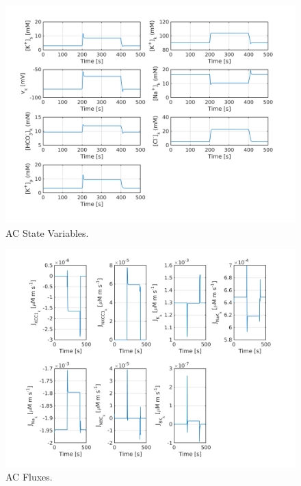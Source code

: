 \begin{landscape}
		\begin{figure}[h!]
			\centering
			\includegraphics{new_figures/2 AC State Variables.png}
			\caption{AC State Variables.}
			\label{fig:2}
		\end{figure}
	
	
		\begin{figure}[h!]
			\centering
			\includegraphics{new_figures/3 AC Fluxes.png}
			\caption{AC Fluxes.}
			\label{fig:3}
		\end{figure}
		

\end{landscape}
